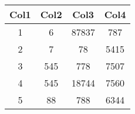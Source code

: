 \documentclass{article}
\begin{document}
    
\begin{tabular}{||c c c c||}
\hline
Col1 & Col2 & Col3 & Col4 \\ [0.5ex]
\hline\hline
1 & 6 & 87837 & 787 \\
\hline
2 & 7 & 78 & 5415 \\
\hline
3 & 545 & 778 & 7507 \\
\hline
4 & 545 & 18744 & 7560 \\
\hline
5 & 88 & 788 & 6344 \\ [1ex]
\hline
\end{tabular}
\end{document}
